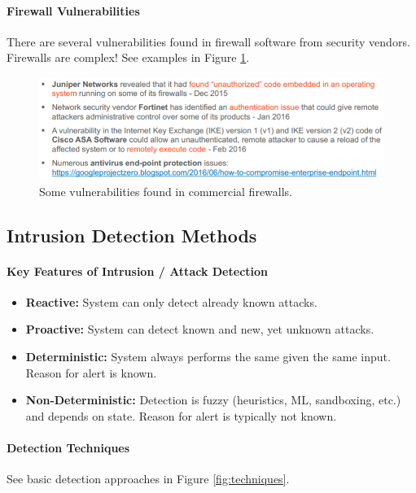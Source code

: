 \paragraph{Firewall Vulnerabilities}
There are several vulnerabilities found in firewall software from security vendors. Firewalls are complex! See examples in Figure \ref{fig:vulnerable}. 

\begin{figure}[h]
	\centering
	\includegraphics[scale=0.8]{images/911-vulnerable.PNG}
	\caption{Some vulnerabilities found in commercial firewalls.}
	\label{fig:vulnerable}
\end{figure}

\subsection{Intrusion Detection Methods}

\paragraph{Key Features of Intrusion / Attack Detection}
\begin{itemize}
    \item \textbf{Reactive:} System can only detect already known attacks.
    \item \textbf{Proactive:} System can detect known and new, yet unknown attacks.
    \item \textbf{Deterministic:} System always performs the same given the same input. Reason for alert is known.
    \item \textbf{Non-Deterministic:} Detection is fuzzy (heuristics, ML, sandboxing, etc.) and depends on state. Reason for alert is typically not known.
\end{itemize}

\paragraph{Detection Techniques}
See basic detection approaches in Figure \ref{fig:techniques}.

